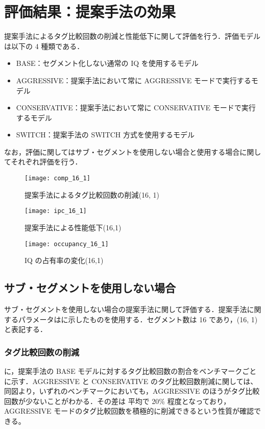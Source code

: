 \section{評価結果：提案手法の効果}
提案手法によるタグ比較回数の削減と性能低下に関して評価を行う．評価モデルは以下の 4 種類である．
\begin{itemize}
  \item BASE：セグメント化しない通常の IQ を使用するモデル
  \item AGGRESSIVE：提案手法において常に AGGRESSIVE モードで実行するモデル
  \item CONSERVATIVE：提案手法において常に CONSERVATIVE モードで実行するモデル
  \item SWITCH：提案手法の SWITCH 方式を使用するモデル 
\end{itemize}

なお，評価に関してはサブ・セグメントを使用しない場合と使用する場合に関してそれぞれ評価を行う．

\begin{figure}[htb]
  \centering
  \texttt{[image: comp\_16\_1]}
  \caption{提案手法によるタグ比較回数の削減(16, 1)}
  \label{fig:comp_16_1}
\end{figure}
\begin{figure}[htb]
  \centering
  \texttt{[image: ipc\_16\_1]}
  \caption{提案手法による性能低下(16,1)}
  \label{fig:ipc_16_1}
\end{figure}
\begin{figure}[htb]
  \centering
  \texttt{[image: occupancy\_16\_1]}
  \caption{IQ の占有率の変化(16,1)}
  \label{fig:occupancy_16_1}
\end{figure}

\subsection{サブ・セグメントを使用しない場合}
サブ・セグメントを使用しない場合の提案手法に関して評価する．提案手法に関するパラメータはに示したものを使用する．セグメント数は 16 であり，(16, 1)と表記する．

\subsubsection{タグ比較回数の削減}
に，提案手法の BASE モデルに対するタグ比較回数の割合をベンチマークごとに示す．AGGRESSIVE と CONSERVATIVE のタグ比較回数削減に関しては、同図より，いずれのベンチマークにおいても，AGGRESSIVE のほうがタグ比較回数が少ないことがわかる．その差は 平均で 20\% 程度となっており，AGGRESSIVE モードのタグ比較回数を積極的に削減できるという性質が確認できる。

